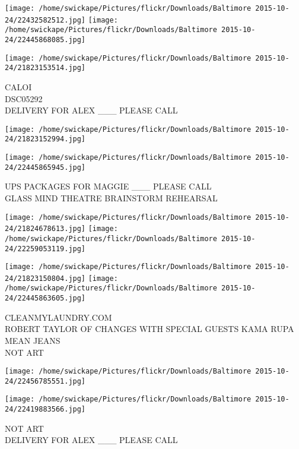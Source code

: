 \documentclass[10pt,letterpaper]{article}
\begin{document}
\texttt{[image: /home/swickape/Pictures/flickr/Downloads/Baltimore 2015-10-24/22432582512.jpg]}
\texttt{[image: /home/swickape/Pictures/flickr/Downloads/Baltimore 2015-10-24/22445868085.jpg]}

\vspace{0.25in}
\texttt{[image: /home/swickape/Pictures/flickr/Downloads/Baltimore 2015-10-24/21823153514.jpg]}

CALOI\\
DSC05292\\
DELIVERY FOR ALEX \_\_\_ PLEASE CALL\\
\pagebreak

\texttt{[image: /home/swickape/Pictures/flickr/Downloads/Baltimore 2015-10-24/21823152994.jpg]}

\vspace{0.25in}
\texttt{[image: /home/swickape/Pictures/flickr/Downloads/Baltimore 2015-10-24/22445865945.jpg]}

UPS PACKAGES FOR MAGGIE \_\_\_ PLEASE CALL\\
GLASS MIND THEATRE BRAINSTORM REHEARSAL\\
\pagebreak

\texttt{[image: /home/swickape/Pictures/flickr/Downloads/Baltimore 2015-10-24/21824678613.jpg]}
\texttt{[image: /home/swickape/Pictures/flickr/Downloads/Baltimore 2015-10-24/22259053119.jpg]}

\texttt{[image: /home/swickape/Pictures/flickr/Downloads/Baltimore 2015-10-24/21823150804.jpg]}
\texttt{[image: /home/swickape/Pictures/flickr/Downloads/Baltimore 2015-10-24/22445863605.jpg]}

CLEANMYLAUNDRY.COM\\
ROBERT TAYLOR OF CHANGES WITH SPECIAL GUESTS KAMA RUPA\\
MEAN JEANS\\
NOT ART\\
\pagebreak

\texttt{[image: /home/swickape/Pictures/flickr/Downloads/Baltimore 2015-10-24/22456785551.jpg]}

\vspace{0.25in}
\texttt{[image: /home/swickape/Pictures/flickr/Downloads/Baltimore 2015-10-24/22419883566.jpg]}

NOT ART\\
DELIVERY FOR ALEX \_\_\_ PLEASE CALL\\
\pagebreak
\end{document}
